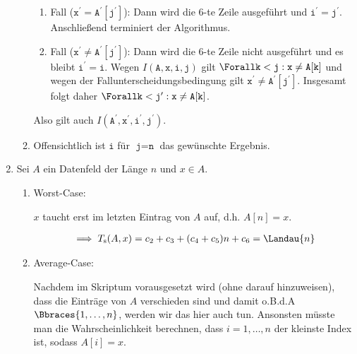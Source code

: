 \begin{solution}
\begin{enumerate}[label = (\alph*)]
\begin{enumerate}[label = \arabic*.]
    \begin{enumerate}[label = \Roman*.]

      \item Fall ($\texttt{x}^\prime = \texttt{A}^\prime[\texttt{j}^\prime]$):
      Dann wird die $6$-te Zeile ausgeführt und $\texttt{i}^\prime = \texttt{j}^\prime$.
      Anschließend terminiert der Algorithmus.

      \item Fall ($\texttt{x}^\prime \neq \texttt{A}^\prime[\texttt{j}^\prime]$):
      Dann wird die $6$-te Zeile nicht ausgeführt und es bleibt $\texttt{i}^\prime = \texttt{i}$.
      Wegen $I(\texttt{A}, \texttt{x}, \texttt{i}, \texttt{j})$ gilt $\Forall \texttt{k} < \texttt{j}: \texttt{x} \neq \texttt{A}[\texttt{k}]$ und wegen der Fallunterscheidungsbedingung gilt $\texttt{x}^\prime \neq \texttt{A}^\prime[\texttt{j}^\prime]$.
      Insgesamt folgt daher $\Forall \texttt{k} < \texttt{j}^\prime: \texttt{x} \neq \texttt{A}[\texttt{k}]$.
    \end{enumerate}

    Also gilt auch $I(\texttt{A}^\prime, \texttt{x}^\prime, \texttt{i}^\prime, \texttt{j}^\prime)$.

    \item Offensichtlich ist $\texttt{i}$ für $\texttt{j} = \texttt{n}$ das gewünschte Ergebnis.

  \end{enumerate}

  \item Sei $A$ ein Datenfeld der Länge $n$ und $x \in A$.

  \begin{enumerate}[label = \arabic*.]

    \item Worst-Case:

    $x$ taucht erst im letzten Eintrag von $A$ auf, d.h. $A[n] = x$.

    \begin{align*}
      \implies
      T_{\mathrm{s}}(A, x)
      =
      c_2 + c_3 + (c_4 + c_5) n + c_6
      =
      \Landau{n}
    \end{align*}

    \item Average-Case:

    Nachdem im Skriptum vorausgesetzt wird (ohne darauf hinzuweisen), dass die Einträge von $A$ verschieden sind und damit o.B.d.A $\Bbraces{1, \dots, n}$, werden wir das hier auch tun.
    Ansonsten müsste man die Wahrscheinlichkeit berechnen, dass $i = 1, \dots, n$ der kleinste Index ist, sodass $A[i] = x$.


\end{enumerate}
\end{enumerate}
\end{solution}
